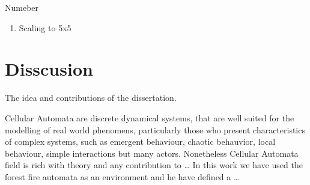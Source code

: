 \documentclass[
]{book}
\providecommand{\tightlist}{%
  \setlength{\itemsep}{0pt}\setlength{\parskip}{0pt}}
\begin{document}
\begin{table}

\caption{\label{tab:3x3}Hyperparamerters of 3x3 forest firest environments runs.}
\centering
{}
\end{table}

Numeber

\begin{enumerate}
\def\labelenumi{\arabic{enumi}.}
\setcounter{enumi}{1}
\tightlist
\item
  Scaling to 5x5
\end{enumerate}

\hypertarget{disscusion}{%
\section{Disscusion}\label{disscusion}}

The idea and contributions of the dissertation.

Cellular Automata are discrete dynamical systems, that are well suited for the modelling of real world phenomens, particularly those who present characteristics of complex systems, such as emergent behaviour, chaotic behauvior, local behaviour, simple interactions but many actors.
Nonetheless Cellular Automata field is rich with theory and any contribution to \ldots{}
In this work we have used the forest fire automata as an environment and he have defined a \ldots{}
\end{document}
